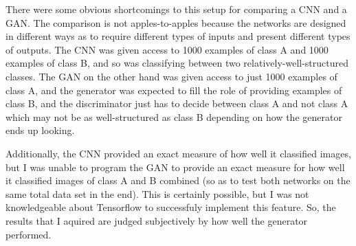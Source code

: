 \documentclass{article}
\begin{document}
There were some obvious shortcomings to this setup for comparing a CNN and a GAN.
The comparison is not apples-to-apples because the networks are designed in different ways as to require different types of inputs and present different types of outputs.
The CNN was given access to 1000 examples of class A and 1000 examples of class B, and so was classifying between two relatively-well-structured classes.
The GAN on the other hand was given access to just 1000 examples of class A, and the generator was expected to fill the role of providing examples of class B, and the discriminator just has to decide between class A and not class A which may not be as well-structured as class B depending on how the generator ends up looking.

Additionally, the CNN provided an exact measure of how well it classified images, but I was unable to program the GAN to provide an exact measure for how well it classified images of class A and B combined (so as to test both networks on the same total data set in the end).
This is certainly possible, but I was not knowledgeable about Tensorflow to successfuly implement this feature.
So, the results that I aquired are judged subjectively by how well the generator performed.

\end{document}

